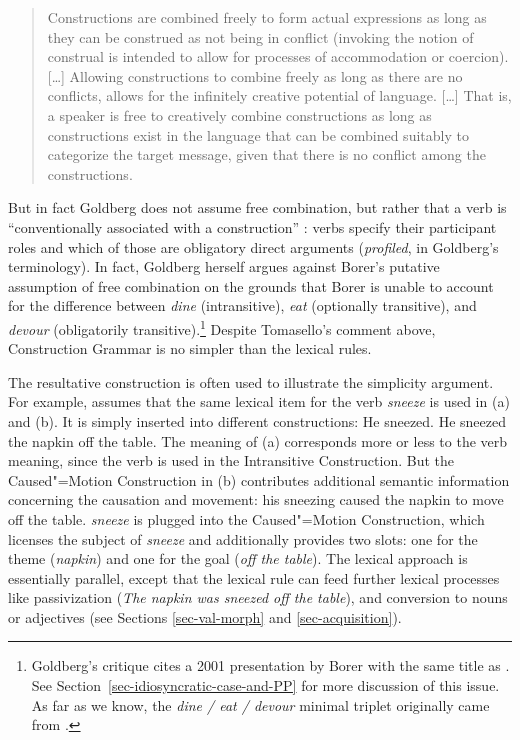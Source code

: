 \begin{quote}
Constructions are combined freely to form actual expressions as long
as they can be construed as not being in conflict (invoking the notion
of construal is intended to allow for processes of accommodation or
coercion). [\ldots]
Allowing constructions to combine freely as long as there are no
conflicts, allows for the infinitely creative potential of language.
[\ldots] That is, a speaker is free to creatively combine constructions as
long as constructions exist in the language that can be combined
suitably to categorize the target message, given that there is no
conflict among the constructions.  \citep[]{Goldberg2006a} 
\end{quote}

\noindent
But in fact Goldberg does not assume free combination, but rather that a verb is ``conventionally
associated with a construction'' \citep[]{Goldberg95a}: verbs specify their participant roles and which
of those are obligatory direct arguments (\emph{profiled}, in Goldberg's terminology).  In fact, Goldberg herself \citeyearpar[]{Goldberg2006a}
argues against Borer's putative assumption of free combination \citeyearpar{Borer2003a-u} on the grounds that Borer is
unable to account for the difference between \emph{dine} (intransitive), \emph{eat} (optionally
transitive), and \emph{devour} (obligatorily transitive).\footnote{Goldberg's critique cites a 2001
  presentation by Borer with the same title as .  See
  Section~\ref{sec-idiosyncratic-case-and-PP} for more discussion of this issue.  As far as
we know, the \emph{dine / eat / devour} minimal triplet originally came from \citet[--90]{Dowty89b-u}. }
Despite Tomasello's comment above,
Construction Grammar is no simpler than the lexical rules.   

The resultative construction is often used to illustrate the simplicity argument.  For example,  
\citet[Chapter~7]{Goldberg95a} assumes that the same lexical item for the verb \emph{sneeze}
is used in (a) and (b). It is simply inserted into different constructions:
\eal
\ex He sneezed.
\ex He sneezed the napkin off the table.
\zl
The meaning of (a) corresponds more or less to the verb meaning, since the verb is used in
the Intransitive Construction. But the Caused"=Motion Construction in (b) contributes
additional semantic information concerning the causation and movement: his sneezing caused the
napkin to move off the table.  \emph{sneeze} is plugged into the Caused"=Motion Construction, which
licenses the subject of \emph{sneeze} and additionally provides two slots: one for the theme
(\emph{napkin}) and one for the goal (\emph{off the table}).  The lexical approach is essentially parallel,
except that the lexical rule can feed further lexical processes like passivization (\emph{The napkin
  was sneezed off the table}), and conversion to nouns or adjectives (see Sections
\ref{sec-val-morph} and \ref{sec-acquisition}).   

